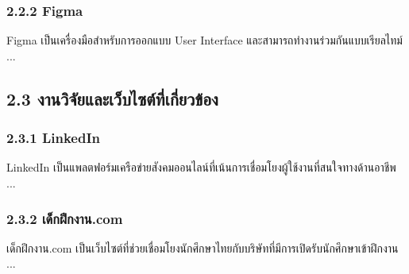 \documentclass[12pt,oneside,a4paper]{article}
\begin{document}
\subsubsection{2.2.2 Figma}
Figma เป็นเครื่องมือสำหรับการออกแบบ User Interface และสามารถทำงานร่วมกันแบบเรียลไทม์ ...

\subsection{2.3 งานวิจัยและเว็บไซต์ที่เกี่ยวข้อง}
\subsubsection{2.3.1 LinkedIn}
LinkedIn เป็นแพลตฟอร์มเครือข่ายสังคมออนไลน์ที่เน้นการเชื่อมโยงผู้ใช้งานที่สนใจทางด้านอาชีพ ...

\subsubsection{2.3.2 เด็กฝึกงาน.com}
เด็กฝึกงาน.com เป็นเว็บไซต์ที่ช่วยเชื่อมโยงนักศึกษาไทยกับบริษัทที่มีการเปิดรับนักศึกษาเข้าฝึกงาน ...
\end{document}
